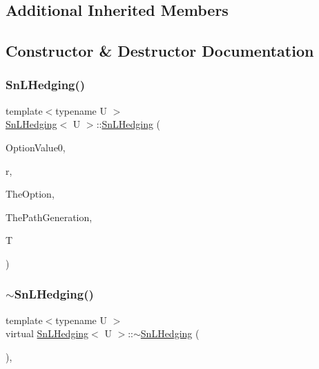 \subsection*{Additional Inherited Members}


\subsection{Constructor \& Destructor Documentation}
\hypertarget{classSnLHedging_af648095f99d30d5792d96834830a91cf}{}\label{classSnLHedging_af648095f99d30d5792d96834830a91cf} 
\subsubsection{\texorpdfstring{Sn\+L\+Hedging()}{SnLHedging()}}
{\footnotesize\ttfamily template$<$typename U $>$ \\
\hyperlink{classSnLHedging}{Sn\+L\+Hedging}$<$ U $>$\+::\hyperlink{classSnLHedging}{Sn\+L\+Hedging} (\begin{DoxyParamCaption}\item[{double}]{Option\+Value0,  }\item[{double}]{r,  }\item[{shared\+\_\+ptr$<$ U $>$}]{The\+Option,  }\item[{\hyperlink{classPathGenerationGBM}{Path\+Generation\+G\+BM} $\ast$}]{The\+Path\+Generation,  }\item[{double}]{T }\end{DoxyParamCaption})}

\hypertarget{classSnLHedging_a89f42282121a44ce30c85de6fd3d4829}{}\label{classSnLHedging_a89f42282121a44ce30c85de6fd3d4829} 
\subsubsection{\texorpdfstring{$\sim$\+Sn\+L\+Hedging()}{~SnLHedging()}}
{\footnotesize\ttfamily template$<$typename U $>$ \\
virtual \hyperlink{classSnLHedging}{Sn\+L\+Hedging}$<$ U $>$\+::$\sim$\hyperlink{classSnLHedging}{Sn\+L\+Hedging} (\begin{DoxyParamCaption}{ }\end{DoxyParamCaption})\hspace{0.3cm}{\ttfamily [inline]}, {\ttfamily [virtual]}}



